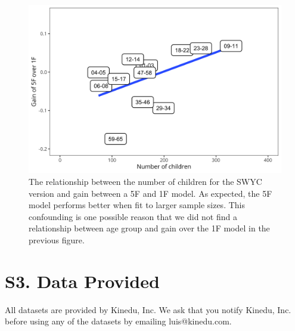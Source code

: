 \documentclass[man]{apa7}
\begin{document}
\begin{figure}
\centering
\includegraphics[width=\textwidth]{figures/07.png}
\caption{The relationship between the number of children for the SWYC version and gain between a 5F and 1F model. As expected, the 5F model performs better when fit to larger sample sizes. This confounding is one possible reason that we did not find a relationship between age group and gain over the 1F model in the previous figure.}
\label{fig:confound}
\end{figure}


\section{S3. Data Provided}

All datasets are provided by Kinedu, Inc. We ask that you notify Kinedu, Inc. before using any of the datasets by emailing luis@kinedu.com. \\\\
\end{document}
